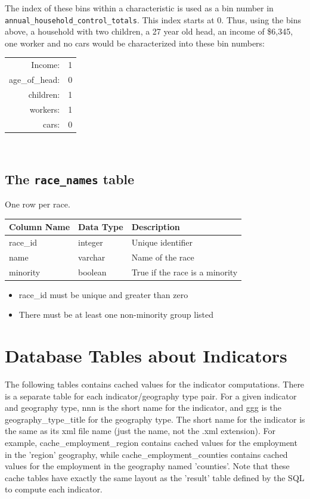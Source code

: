 The index of these bins within a characteristic is used as a bin number in
{\tt annual_household_control_totals}. This index starts at 0. Thus,
using the bins above, a household with two children, a 27 year old head, an
income of \$6,345, one worker and no cars would be characterized into these bin
numbers:

\begin{tabular}{rl}
Income:  &1 \\
age_of_head:  &0 \\
children:  &1 \\
workers:  &1 \\
cars:  &0
\end{tabular} \\





\subsection{The {\tt race_names} table}


One row per race.


\begin{tabular}{|l|l|l|}
\hline
\textbf{Column Name} & \textbf{Data Type} & \textbf{Description} \\
\hline
race_id & integer & Unique identifier  \\
\hline
name & varchar & Name of the race  \\
\hline
minority & boolean & True if the race is a minority  \\
\hline

\end{tabular}

\begin{itemize} \tight
\item race_id must be unique and greater than zero
\item There must be at least one non-minority group listed

\end{itemize}

\section{Database Tables about Indicators}


The following tables contains cached values for the indicator computations.
There is a separate table for each indicator/geography type pair. For a given
indicator and geography type, nnn is the short name for the indicator, and ggg
is the geography_type_title for the geography type. The short name for the
indicator is the same as its xml file name (just the name, not the .xml
extension). For example, cache_employment_region contains cached values for the
employment in the 'region' geography, while cache_employment_counties contains
cached values for the employment in the geography named 'counties'. Note that
these cache tables have exactly the same layout as the 'result' table defined
by the SQL to compute each indicator.


